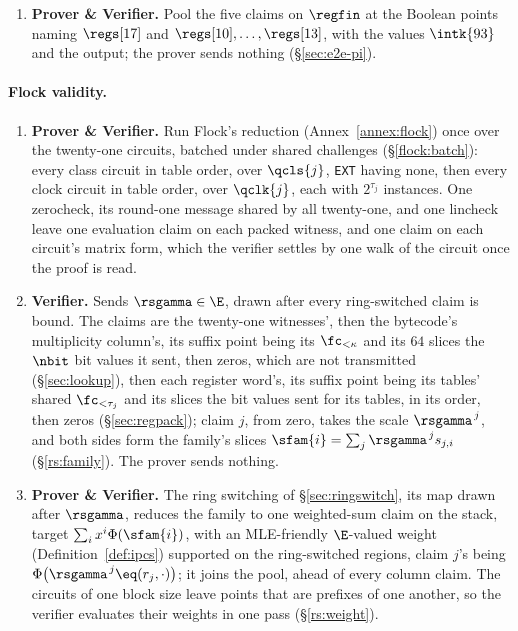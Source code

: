 \begin{enumerate}
\item \textbf{Prover \& Verifier.} Pool the five claims on $\regfin$ at the Boolean points naming $\regs[17]$ and $\regs[10],\dots,\regs[13]$, with the values $\intk{93}$ and the output; the prover sends nothing (\S\ref{sec:e2e-pi}).
\end{enumerate}

\paragraph{Flock validity.}

\begin{enumerate}
\item \textbf{Prover \& Verifier.} Run Flock's reduction (Annex~\ref{annex:flock}) once over the twenty-one circuits, batched under shared challenges (\S\ref{flock:batch}): every class circuit in table order, over $\qcls{j}$, \texttt{EXT} having none, then every clock circuit in table order, over $\qclk{j}$, each with $2^{\tau_j}$ instances. One zerocheck, its round-one message shared by all twenty-one, and one lincheck leave one evaluation claim on each packed witness, and one claim on each circuit's matrix form, which the verifier settles by one walk of the circuit once the proof is read.
\item \textbf{Verifier.} Sends $\rsgamma\in\E$, drawn after every ring-switched claim is bound. The claims are the twenty-one witnesses', then the bytecode's multiplicity column's, its suffix point being its $\fc_{<\kappa}$ and its $64$ slices the $\nbit$ bit values it sent, then zeros, which are not transmitted (\S\ref{sec:lookup}), then each register word's, its suffix point being its tables' shared $\fc_{<\tau_j}$ and its slices the bit values sent for its tables, in its order, then zeros (\S\ref{sec:regpack}); claim $j$, from zero, takes the scale $\rsgamma^{\,j}$, and both sides form the family's slices $\sfam{i}=\sum_j\rsgamma^{\,j}s_{j,i}$ (\S\ref{rs:family}). The prover sends nothing.
\item \textbf{Prover \& Verifier.} The ring switching of \S\ref{sec:ringswitch}, its map drawn after $\rsgamma$, reduces the family to one weighted-sum claim on the stack, target $\sum_ix^i\Phi(\sfam{i})$, with an MLE-friendly $\E$-valued weight (Definition~\ref{def:ipcs}) supported on the ring-switched regions, claim $j$'s being $\Phi\bigl(\rsgamma^{\,j}\eq(r_j,\cdot)\bigr)$; it joins the pool, ahead of every column claim. The circuits of one block size leave points that are prefixes of one another, so the verifier evaluates their weights in one pass (\S\ref{rs:weight}).
\end{enumerate}


